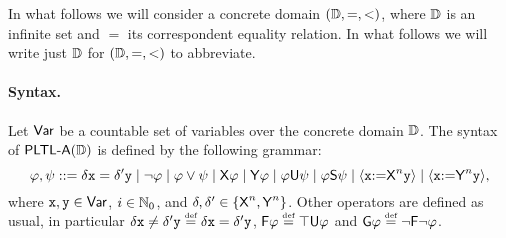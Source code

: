 In what follows we will consider a concrete domain $(\mathbb{D},=,<)$, where $\mathbb{D}$ is an infinite set and $=$ its correspondent equality relation. In what follows we will write just $\mathbb{D}$ for $(\mathbb{D},=,<)$ to abbreviate.

\paragraph{Syntax.} Let ${\rm \sf Var}$ be a countable set of variables over the concrete domain $\mathbb{D}$. The syntax of ${\rm\textsf{PLTL-A}}(\mathbb{D})$ is defined by the following grammar:
\[
    \varphi,\psi ::= \delta\mathtt{x} = \delta'\mathtt{y} \mid \neg\varphi \mid \varphi \vee \psi \mid {\operatorname{\sf X}}\varphi \mid {\operatorname{\sf Y}}\varphi \mid \varphi {\operatorname{\sf U}} \psi \mid \varphi{\operatorname{\sf S}}\psi \mid \langle{\mathtt{x}{:=}{\operatorname{\sf X}}^n\mathtt{y}}\rangle \mid \langle{\mathtt{x}{:=}{\operatorname{\sf Y}}^n\mathtt{y}}\rangle,
\]
where $\mathtt{x},\mathtt{y}\in{\rm \sf Var}$, $i\in\mathbb{N}_0$, and $\delta,\delta'\in\{{\operatorname{\sf X}}^n,{\operatorname{\sf Y}}^n\}$. Other operators are defined as usual, in particular $\delta\avar \neq \delta'\avarbis\egdef \delta\avar = \delta'\avarbis$, $\Eventually\aformula \egdef \top\Until\aformula$ and $\Always\aformula \egdef \neg\Eventually\neg\aformula$. 



